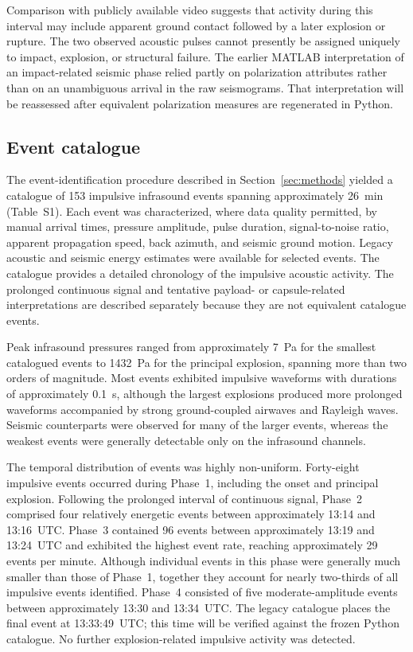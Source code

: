 \documentclass[]{seismica}
\begin{document}
Comparison with publicly available video suggests that activity during this
interval may include apparent ground contact followed by a later explosion or
rupture. The two observed acoustic pulses cannot presently be assigned uniquely
to impact, explosion, or structural failure. The earlier MATLAB interpretation
of an impact-related seismic phase relied partly on polarization attributes
rather than on an unambiguous arrival in the raw seismograms. That
interpretation will be reassessed after equivalent polarization measures are
regenerated in Python.

\subsection{Event catalogue}
\label{sec:results_catalogue}

The event-identification procedure described in Section~\ref{sec:methods}
yielded a catalogue of 153 impulsive infrasound events spanning approximately
26~min (Table~S1). Each event was characterized, where data quality permitted,
by manual arrival times, pressure amplitude, pulse duration, signal-to-noise
ratio, apparent propagation speed, back azimuth, and seismic ground motion.
Legacy acoustic and seismic energy estimates were available for selected
events. The catalogue provides a detailed chronology of the impulsive acoustic
activity. The prolonged continuous signal and tentative payload- or
capsule-related interpretations are described separately because they are not
equivalent catalogue events.

Peak infrasound pressures ranged from approximately 7~Pa for the smallest catalogued events to 1432~Pa for the principal explosion, spanning more than two orders of magnitude. Most events exhibited impulsive waveforms with durations of approximately 0.1~s, although the largest explosions produced more prolonged waveforms accompanied by strong ground-coupled airwaves and Rayleigh waves. Seismic counterparts were observed for many of the larger events, whereas the weakest events were generally detectable only on the infrasound channels.

The temporal distribution of events was highly non-uniform. Forty-eight impulsive events occurred during Phase~1, including the onset and principal explosion. Following the prolonged interval of continuous signal, Phase~2 comprised four relatively energetic events between approximately 13:14 and 13:16~UTC. Phase~3 contained 96 events between approximately 13:19 and 13:24~UTC and exhibited the highest event rate, reaching approximately 29 events per minute. Although individual events in this phase were generally much smaller than those of Phase~1, together they account for nearly two-thirds of all impulsive events identified. Phase~4 consisted of five moderate-amplitude events between approximately
13:30 and 13:34~UTC. The legacy catalogue places the final event at
13:33:49~UTC; this time will be verified against the frozen Python catalogue.
No further explosion-related impulsive activity was detected.
\end{document}
